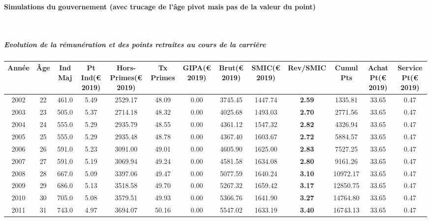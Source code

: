 \newpage 
 
\paragraph{Simulations du gouvernement (avec trucage de l'âge pivot mais pas de la valeur du point)}  ~\\ 
 
\subparagraph{Evolution de la rémunération et des points retraites au cours de la carrière} 
 
{ \scriptsize \begin{center} 
\begin{tabular}[htb]{|c|c||c|c|c|c|c|c||c|c||c|c|c||} 
\hline 
 Année &  Âge &  Ind Maj &  Pt Ind(\euro{} 2019) &   Hors-Primes(\euro{} 2019) &  Tx Primes &  GIPA(\euro{} 2019) &  Brut(\euro{} 2019) &  SMIC(\euro{} 2019) &  Rev/SMIC &  Cumul Pts &  Achat Pt(\euro{} 2019) &  Service Pt(\euro{} 2019) \\ 
\hline \hline 
 2002 &  22 &  461.0 &  5.49 &  2529.17 &  48.09 &  0.00 &  3745.45 &  1447.74 &  {\bf 2.59} &  1335.81 &  33.65 &  0.47 \\ 
\hline 
 2003 &  23 &  505.0 &  5.37 &  2714.18 &  48.32 &  0.00 &  4025.68 &  1493.03 &  {\bf 2.70} &  2771.56 &  33.65 &  0.47 \\ 
\hline 
 2004 &  24 &  555.0 &  5.29 &  2935.79 &  48.55 &  0.00 &  4361.12 &  1547.32 &  {\bf 2.82} &  4326.94 &  33.65 &  0.47 \\ 
\hline 
 2005 &  25 &  555.0 &  5.29 &  2935.48 &  48.78 &  0.00 &  4367.40 &  1603.67 &  {\bf 2.72} &  5884.57 &  33.65 &  0.47 \\ 
\hline 
 2006 &  26 &  591.0 &  5.23 &  3091.00 &  49.01 &  0.00 &  4605.90 &  1625.00 &  {\bf 2.83} &  7527.25 &  33.65 &  0.47 \\ 
\hline 
 2007 &  27 &  591.0 &  5.19 &  3069.94 &  49.24 &  0.00 &  4581.58 &  1634.08 &  {\bf 2.80} &  9161.26 &  33.65 &  0.47 \\ 
\hline 
 2008 &  28 &  667.0 &  5.09 &  3397.06 &  49.47 &  0.00 &  5077.59 &  1640.24 &  {\bf 3.10} &  10972.17 &  33.65 &  0.47 \\ 
\hline 
 2009 &  29 &  686.0 &  5.13 &  3518.58 &  49.70 &  0.00 &  5267.32 &  1659.42 &  {\bf 3.17} &  12850.75 &  33.65 &  0.47 \\ 
\hline 
 2010 &  30 &  705.0 &  5.08 &  3579.51 &  49.93 &  0.00 &  5366.76 &  1641.90 &  {\bf 3.27} &  14764.80 &  33.65 &  0.47 \\ 
\hline 
 2011 &  31 &  743.0 &  4.97 &  3694.07 &  50.16 &  0.00 &  5547.02 &  1633.19 &  {\bf 3.40} &  16743.13 &  33.65 &  0.47 \\ 

\end{tabular}
\end{center}}
